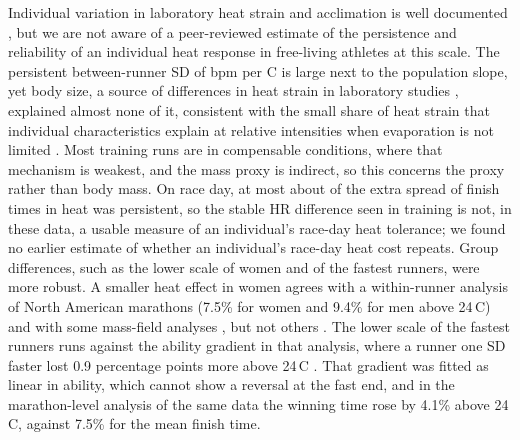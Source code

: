 \documentclass[12pt]{article}
\newcommand{\degC}{\,\textdegree C}
\newcommand{\bpmC}{bpm per \textdegree C}
\begin{document}
Individual variation in laboratory heat strain and acclimation is well documented \cite{mee2015,corbett2018}, but we are not aware of a peer-reviewed estimate of the persistence and reliability of an individual heat response in free-living athletes at this scale. The persistent between-runner SD of \sdPersistent{} \bpmC{} is large next to the population slope, yet body size, a source of differences in heat strain in laboratory studies \cite{marino2000,cramer2014}, explained almost none of it, consistent with the small share of heat strain that individual characteristics explain at relative intensities when evaporation is not limited \cite{havenith1998,jay2011}. Most training runs are in compensable conditions, where that mechanism is weakest, and the mass proxy is indirect, so this concerns the proxy rather than body mass. On race day, at most about \persistSpreadShare{} of the extra spread of finish times in heat was persistent, so the stable HR difference seen in training is not, in these data, a usable measure of an individual's race-day heat tolerance; we found no earlier estimate of whether an individual's race-day heat cost repeats. Group differences, such as the lower scale of women and of the fastest runners, were more robust. A smaller heat effect in women agrees with a within-runner analysis of North American marathons (7.5\% for women and 9.4\% for men above 24\degC) \cite{oliveira2026} and with some mass-field analyses \cite{vihma2010,trubee2014}, but not others \cite{knechtle2021b,wang2024}. The lower scale of the fastest runners runs against the ability gradient in that analysis, where a runner one SD faster lost 0.9 percentage points more above 24\degC{} \cite{oliveira2026}. That gradient was fitted as linear in ability, which cannot show a reversal at the fast end, and in the marathon-level analysis of the same data the winning time rose by 4.1\% above 24\degC, against 7.5\% for the mean finish time.
\end{document}
